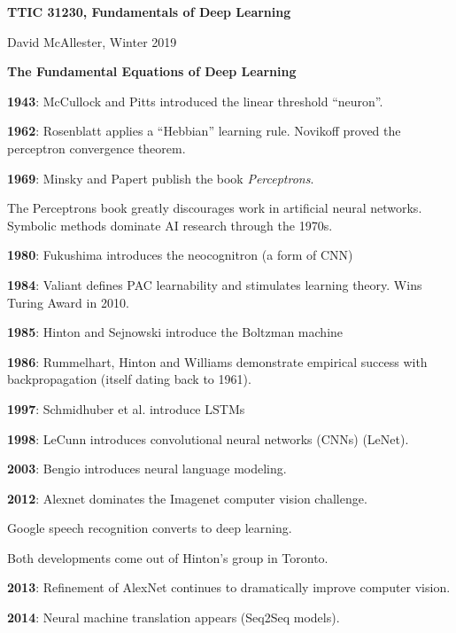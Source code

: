 




{\Huge
  \centerline{\bf TTIC 31230,  Fundamentals of Deep Learning}
  \vfill
  \centerline{David McAllester, Winter 2019}
  \vfill
  \centerline{\bf The Fundamental Equations of Deep Learning}



{\bf 1943}: McCullock and Pitts introduced the linear threshold ``neuron''.

\vfill
{\bf 1962}: Rosenblatt applies a ``Hebbian'' learning rule.  Novikoff proved the perceptron convergence theorem.

\vfill
{\bf 1969}: Minsky and Papert publish the book {\it Perceptrons}.

\vfill
The Perceptrons book greatly discourages work in artificial neural networks.  Symbolic methods dominate AI research through the 1970s.


{\bf 1980}: Fukushima introduces the neocognitron (a form of CNN)

\vfill
{\bf 1984}: Valiant defines PAC learnability and stimulates learning theory. Wins Turing Award in 2010.

\vfill
{\bf 1985}: Hinton and Sejnowski introduce the Boltzman machine

\vfill
{\bf 1986}: Rummelhart, Hinton and Williams demonstrate empirical success with backpropagation (itself dating back to 1961).


{\bf 1997}: Schmidhuber et al. introduce LSTMs

\vfill
{\bf 1998}: LeCunn introduces convolutional neural networks (CNNs) (LeNet).

\vfill
{\bf 2003}: Bengio introduces neural language modeling.


{\bf 2012}: Alexnet dominates the Imagenet computer vision challenge.

\vfill
Google speech recognition converts to deep learning.

\vfill
Both developments come out of Hinton's group in Toronto.

\vfill
{\bf 2013}: Refinement of AlexNet continues to dramatically improve computer vision.

\vfill
{\bf 2014}: Neural machine translation appears (Seq2Seq models).

}
